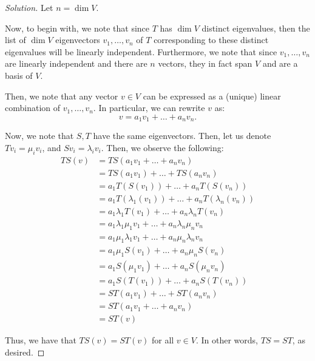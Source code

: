 \documentclass{article}
\newenvironment{solution}{\begin{proof}[Solution]}{\end{proof}}
\begin{document}
	\begin{solution}
		Let $n = \dim V$.
				
		Now, to begin with, we note that since $T$ has $\dim V$ distinct eigenvalues, then the list of $\dim V$ eigenvectors $v_{1}, \ldots, v_{n}$ of $T$ corresponding to these distinct eigenvalues will be linearly independent. Furthermore, we note that since $v_{1}, \ldots, v_{n}$ are linearly independent and there are $n$ vectors, they in fact span $V$ and are a basis of $V$.
		
		Then, we note that any vector $v \in V$ can be expressed as a (unique) linear combination of $v_{1}, \ldots, v_{n}$. In particular, we can rewrite $v$ as:
		\begin{equation*}
			v = a_{1}v_{1} + \ldots + a_{n}v_{n}.
		\end{equation*}
	
		Now, we note that $S,T$ have the same eigenvectors. Then, let us denote $Tv_{i} = \mu_{i} v_{i}$, and $Sv_{i} = \lambda_i v_{i}$. Then, we observe the following:
		\begin{align*}
			TS(v) &= TS(a_{1}v_{1} + \ldots + a_{n}v_{n}) \\
			&= TS(a_{1}v_{1}) + \ldots + TS(a_{n}v_{n}) \\
			&= a_{1}T(S(v_{1})) + \ldots + a_{n}T(S(v_{n})) \\
			&= a_{1}T(\lambda_1(v_{1})) + \ldots + a_{n}T(\lambda_n(v_{n})) \\
			&= a_{1}\lambda_1 T(v_{1}) + \ldots + a_{n}\lambda_n T(v_{n}) \\
			&= a_{1}\lambda_1\mu_1v_{1} + \ldots + a_{n}\lambda_n \mu_n v_{n} \\
			&= a_{1}\mu_1\lambda_1v_{1} + \ldots + a_{n}\mu_n \lambda_n v_{n} \\
			&= a_{1}\mu_1S(v_{1}) + \ldots + a_{n}\mu_n S(v_{n}) \\
			&= a_{1}S(\mu_1v_{1}) + \ldots + a_{n} S(\mu_n v_{n}) \\
			&= a_{1}S(T(v_{1})) + \ldots + a_{n} S(T(v_{n})) \\
			&= ST(a_{1}v_{1}) + \ldots + ST(a_{n}v_{n}) \\
			&= ST(a_{1}v_{1} + \ldots + a_{n}v_{n}) \\
			&= ST(v)
		\end{align*}
	
		Thus, we have that $TS(v) = ST(v)$ for all $v \in V$. In other words, $TS = ST$, as desired.
	\end{solution}
\end{document}
